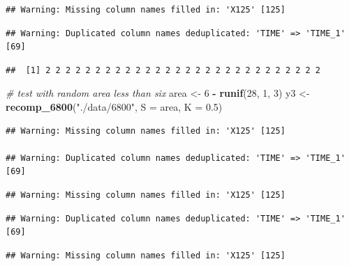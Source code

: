 \documentclass[
]{krantz}
\makeatletter
\newenvironment{Shaded}{\begin{snugshade}}{\end{snugshade}}
\newcommand{\CommentTok}[1]{\textcolor[rgb]{0.56,0.35,0.01}{\textit{#1}}}
\newcommand{\DataTypeTok}[1]{\textcolor[rgb]{0.13,0.29,0.53}{#1}}
\newcommand{\DecValTok}[1]{\textcolor[rgb]{0.00,0.00,0.81}{#1}}
\newcommand{\FloatTok}[1]{\textcolor[rgb]{0.00,0.00,0.81}{#1}}
\newcommand{\KeywordTok}[1]{\textcolor[rgb]{0.13,0.29,0.53}{\textbf{#1}}}
\newcommand{\NormalTok}[1]{#1}
\newcommand{\OperatorTok}[1]{\textcolor[rgb]{0.81,0.36,0.00}{\textbf{#1}}}
\newcommand{\StringTok}[1]{\textcolor[rgb]{0.31,0.60,0.02}{#1}}
\newenvironment{kframe}{%
\medskip{}
\setlength{\fboxsep}{.8em}
 \def\at@end@of@kframe{}%
 \ifinner\ifhmode%
  \def\at@end@of@kframe{\end{minipage}}%
  \begin{minipage}{\columnwidth}%
 \fi\fi%
 \def\FrameCommand##1{\hskip\@totalleftmargin \hskip-\fboxsep
 \colorbox{shadecolor}{##1}\hskip-\fboxsep
     \hskip-\linewidth \hskip-\@totalleftmargin \hskip\columnwidth}%
 \MakeFramed {\advance\hsize-\width
   \@totalleftmargin\z@ \linewidth\hsize
   \@setminipage}}%
 {\par\unskip\endMakeFramed%
 \at@end@of@kframe}
\renewenvironment{Shaded}{\begin{kframe}}{\end{kframe}}
\makeatother
\begin{document}
\begin{verbatim}
## Warning: Missing column names filled in: 'X125' [125]
\end{verbatim}

\begin{verbatim}
## Warning: Duplicated column names deduplicated: 'TIME' => 'TIME_1' [69]
\end{verbatim}

\begin{Shaded}
\end{Shaded}

\begin{verbatim}
##  [1] 2 2 2 2 2 2 2 2 2 2 2 2 2 2 2 2 2 2 2 2 2 2 2 2 2 2 2 2
\end{verbatim}

\begin{Shaded}
\begin{Highlighting}[]
\CommentTok{\# test with random area less than six}
\NormalTok{area \textless{}{-}}\StringTok{ }\DecValTok{6} \OperatorTok{{-}}\StringTok{ }\KeywordTok{runif}\NormalTok{(}\DecValTok{28}\NormalTok{, }\DecValTok{1}\NormalTok{, }\DecValTok{3}\NormalTok{)}
\NormalTok{y3 \textless{}{-}}\StringTok{ }\KeywordTok{recomp\_6800}\NormalTok{(}\StringTok{"./data/6800"}\NormalTok{, }\DataTypeTok{S =}\NormalTok{ area, }\DataTypeTok{K =} \FloatTok{0.5}\NormalTok{)}
\end{Highlighting}
\end{Shaded}

\begin{verbatim}
## Warning: Missing column names filled in: 'X125' [125]

## Warning: Duplicated column names deduplicated: 'TIME' => 'TIME_1' [69]
\end{verbatim}

\begin{verbatim}
## Warning: Missing column names filled in: 'X125' [125]
\end{verbatim}

\begin{verbatim}
## Warning: Duplicated column names deduplicated: 'TIME' => 'TIME_1' [69]
\end{verbatim}

\begin{verbatim}
## Warning: Missing column names filled in: 'X125' [125]
\end{verbatim}
\end{document}
